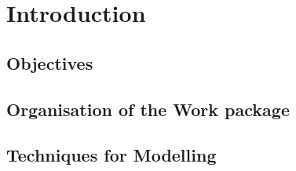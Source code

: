 \section*{Introduction}


\subsection*{Objectives}


\subsection*{Organisation of the Work package}


\subsection*{Techniques for Modelling}



